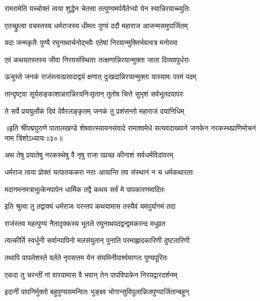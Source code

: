\twolineshloka
{रामरामेति यच्चोक्तं त्वया शुद्धेन चेतसा}
{तत्पुण्यमर्पयैतेभ्यो येन स्यान्निरयाच्च्युतिः}%


\twolineshloka
{एतच्छ्रुत्वा वचस्तस्य धर्मराजस्य धीमतः}
{पुण्यं ददौ महाराज आजन्मसमुपार्जितम्}%

\twolineshloka
{यदा जन्मकृतैः पुण्यै रघुनाथार्चनोद्भवैः}
{एतेषां निरयान्मुक्तिर्भवत्वत्र मनोरमा}%

\twolineshloka
{एवं कथयतस्तस्य जीवा निरयसंस्थिताः}
{तत्क्षणान्निरयान्मुक्ता जाता दिव्यवपुर्धराः}%

\twolineshloka
{ऊचुस्ते जनकं राजंस्त्वत्प्रसादाद्वयं क्षणात्}
{दुःखदान्निरयान्मुक्ता यास्यामः परमं पदम्}%

\twolineshloka
{तान्दृष्ट्वा सूर्यसङ्काशान्नरान्निरयनिःसृतान्}
{तुतोष चित्ते सुभृशं सर्वभूतदयापरः}%

\twolineshloka
{ते सर्वे प्रययुर्लोकं दिवं देवैरलङ्कृतम्}
{जनकं तु प्रशंसन्तो महाराजं दयानिधिम्}%

{॥इति श्रीपद्मपुराणे पातालखण्डे शेषवात्स्यायनसंवादे रामाश्वमेधे सत्यवदाख्याने जनकेन नरकस्थप्राणिमोचनं नाम त्रिंशोऽध्यायः॥३०॥}



\twolineshloka
{अथ तेषु प्रयातेषु नरकस्थेषु वै नृषु}
{राजा पप्रच्छ कीनाशं सर्वधर्मविदांवरम्}%


\twolineshloka
{धर्मराज त्वया प्रोक्तं यत्पातककरा नराः}
{आयान्ति तव संस्थानं न च धर्मकथारताः}%

\twolineshloka
{मदागमनमत्राभूत्केनपापेन धार्मिक}
{तद्वै कथय सर्वं मे पापकारणमादितः}%

\twolineshloka
{इति श्रुत्वा तु तद्वाक्यं धर्मराजः परन्तप}
{कथयामास तस्यैवं यमपुर्यागमं तदा}%


\twolineshloka
{राजंस्तव महत्पुण्यं नैतादृक्कस्य भूतले}
{रघुनाथपदद्वन्द्वमकरन्द मधुव्रत}%

\twolineshloka
{त्वत्कीर्ति स्वर्धुनी सर्वान्पापिनो मलसंयुतान्}
{पुनाति परमाह्लादकारिणी दुष्टतारिणी}%

\twolineshloka
{तथापि पापलेशस्ते वर्तते नृपसत्तम}
{येन संयमिनीपार्श्वमागतः पुण्यपूरितः}%

\twolineshloka
{एकदा तु चरन्तीं गां वारयामास वै भवान्}
{तेन पापविपाकेन निरयद्वारदर्शनम्}%

\twolineshloka
{इदानीं पापनिर्मुक्तो बहुपुण्यसमन्वितः}
{भुङ्क्ष्व भोगान्सुविपुलान्निजपुण्यार्जितान्बहून्}%


